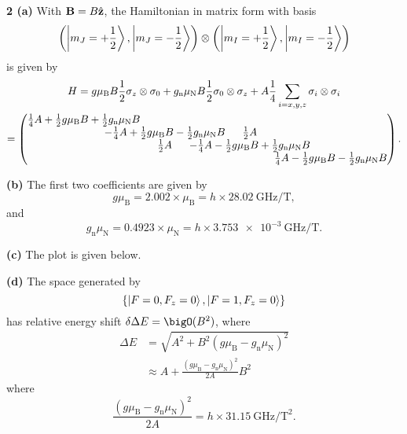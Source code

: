 \documentclass{article}
\makeatletter
\newcommand*{\shifttext}[1]{%
  \settowidth{\@tempdima}{#1}%
  \hspace{-\@tempdima}#1%
}
\newcommand{\plabel}[1]{%
\shifttext{\textbf{#1}\quad}%
}
\newcommand{\prule}{%
\begin{center}%
\hdashrule[0.5ex]{.99\linewidth}{1pt}{1pt 2.5pt}%
\end{center}%
}
\makeatother
\begin{document}
\prule

\plabel{2 (a)}%
With $\vb{B} = B \hat{\vb{z}}$, the Hamiltonian in matrix form with basis
\[ \qty(\ket{m_J=+\frac{1}{2}},\ket{m_J=-\frac{1}{2}}) \otimes \qty(\ket{m_I=+\frac{1}{2}},\ket{m_I=-\frac{1}{2}}) \]
is given by
\begin{gather*}
    H = g \mu_{\mathrm{B}} B \frac{1}{2} \sigma_z \otimes \sigma_0 + g_{\mathrm{n}} \mu_{\mathrm{N}} B \frac{1}{2} \sigma_0 \otimes \sigma_z + A \frac{1}{4} \sum_{i=x,y,z} \sigma_i\otimes \sigma_i \\
    = \arraycolsep=-17pt \begin{pmatrix}
        \frac{1}{4} A + \frac{1}{2} g\mu_{\mathrm{B}} B + \frac{1}{2} g_{\mathrm{n}} \mu_{\mathrm{N}} B & & & \\
        & -\frac{1}{4} A + \frac{1}{2} g\mu_{\mathrm{B}} B - \frac{1}{2} g_{\mathrm{n}} \mu_{\mathrm{N}} B & \frac{1}{2} A \\
        & \frac{1}{2} A & -\frac{1}{4} A - \frac{1}{2} g\mu_{\mathrm{B}} B + \frac{1}{2} g_{\mathrm{n}} \mu_{\mathrm{N}} B \\
        & & & \frac{1}{4} A - \frac{1}{2} g\mu_{\mathrm{B}} B - \frac{1}{2} g_{\mathrm{n}} \mu_{\mathrm{N}} B
    \end{pmatrix}.
\end{gather*}

\plabel{(b)}%
The first two coefficients are given by
\[ g\mu_{\mathrm{B}} = 2.002 \times \mu_{\mathrm{B}} = h\times \SI{28.02}{\giga\hertz\per\tesla}, \]
and
\[ g_{\mathrm{n}} \mu_{\mathrm{N}} = 0.4923 \times \mu_{\mathrm{N}} = h \times \SI{3.753e-3}{\giga\hertz\per\tesla}. \]

\plabel{(c)}%
The plot is given below.
\begin{center}
\end{center}

\plabel{(d)}%
The space generated by
\[ \qty{\ket{F=0,F_z=0}, \ket{F=1,F_z=0}} \]
has relative energy shift $\delta \Delta E = \bigO(B^2)$, where
\begin{align*}
    \Delta E &= \sqrt{A^2 + B^2(g \mu_{\mathrm{B}} - g_{\mathrm{n}} \mu_{\mathrm{N}})^2} \\
    &\approx A + \frac{(g \mu_{\mathrm{B}} - g_{\mathrm{n}} \mu_{\mathrm{N}})^2}{2A} B^2
\end{align*}
where
\[ \frac{(g \mu_{\mathrm{B}} - g_{\mathrm{n}} \mu_{\mathrm{N}})^2}{2A} = h\times \SI{31.15}{\giga\hertz\per\square\tesla}. \]
\end{document}
